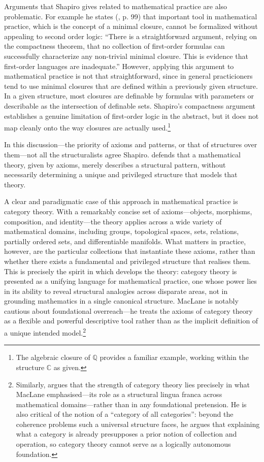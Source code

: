 \documentclass[11pt,a4paper]{article}
\begin{document}
Arguments that Shapiro gives related to mathematical practice are also problematic. For example he states (\citeyear{shapiro1991foundations}, p. 99) that important tool in mathematical practice, which is the concept of a minimal closure, cannot be formalized without appealing to second order logic: ``There is a straightforward argument, relying on the compactness theorem, that no collection of first-order formulas can successfully characterize any non-trivial minimal closure. This is evidence that first-order languages are inadequate.'' However, applying this argument to mathematical practice is not that straightforward, since in general practicioners tend to use minimal closures that are defined within a previously given structure. In a given structure, most closures are definable by formulas with parameters or describable as the intersection of definable sets. Shapiro's compactness argument establishes a genuine limitation of first-order logic in the abstract, but it does not map cleanly onto the way closures are actually used.\footnote{The algebraic closure of $\mathbb{Q}$ provides a familiar example, working within the structure $\mathbb{C}$ as given.}

In this discussion---the priority of axioms and patterns, or that of structures over them---not all the structuralists agree Shapiro. \textcite[Chapter 7]{Resnik1997} defends that a mathematical theory, given by axioms, merely describes a structural pattern, without necessarily determining a unique and privileged structure that models that theory.

A clear and paradigmatic case of this approach in mathematical practice is category theory. With a remarkably concise set of axioms---objects, morphisms, composition, and identity---the theory applies across a wide variety of mathematical domains, including groups, topological spaces, sets, relations, partially ordered sets, and differentiable manifolds. What matters in practice, however, are the particular collections that instantiate these axioms, rather than whether there exists a fundamental and privileged structure that realises them. This is precisely the spirit in which \textcite{maclane1998categories} develops the theory: category theory is presented as a unifying language for mathematical practice, one whose power lies in its ability to reveal structural analogies across disparate areas, not in grounding mathematics in a single canonical structure. MacLane is notably cautious about foundational overreach---he treats the axioms of category theory as a flexible and powerful descriptive tool rather than as the implicit definition of a unique intended model.\footnote{Similarly, \textcite{Feferman2013Category} argues that the strength of category theory lies precisely in what MacLane emphasised---its role as a structural lingua franca across mathematical domains---rather than in any foundational pretension. He is also critical of the notion of a ``category of all categories'': beyond the coherence problems such a universal structure faces, he argues that explaining what a category is already presupposes a prior notion of collection and operation, so category theory cannot serve as a logically autonomous foundation.}
\end{document}
